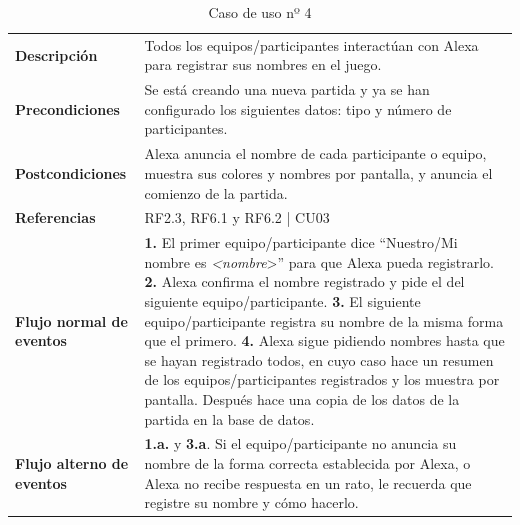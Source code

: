 \begin{table}[H]
	\centering
	\begin{tabular}{|p{3cm}|p{12cm}|}
		\hline
		\rowcolor{lightgray}
		\multicolumn{2}{|c|}{\textbf{CU04}: Registro de participantes} \\
		\hline
		\textbf{Descripción} & Todos los equipos/participantes interactúan con Alexa para registrar sus nombres en el juego. \vspace{0.2cm} \\
		\hline
		\textbf{Precondiciones} & Se está creando una nueva partida y ya se han configurado los siguientes datos: tipo y número de participantes. \vspace{0.2cm} \\
		\hline
		\textbf{Postcondiciones} & Alexa anuncia el nombre de cada participante o equipo, muestra sus colores y nombres por pantalla, y anuncia el comienzo de la partida. \vspace{0.2cm} \\
		\hline
		\textbf{Referencias} & RF2.3, RF6.1 y RF6.2  |  CU03 \vspace{0.2cm} \\
		\hline
		\textbf{Flujo normal de eventos} &
		\textbf{1.} El primer equipo/participante dice \enquote{Nuestro/Mi nombre es \textit{<nombre}>} para que Alexa pueda registrarlo. \newline
		\vspace{0.2cm}
		\textbf{2.} Alexa confirma el nombre registrado y pide el del siguiente equipo/participante. \newline
		\vspace{0.2cm}
		\textbf{3.} El siguiente equipo/participante registra su nombre de la misma forma que el primero. \newline
		\vspace{0.2cm} 
		\textbf{4.} Alexa sigue pidiendo nombres hasta que se hayan registrado todos, en cuyo caso hace un resumen de los equipos/participantes registrados y los muestra por pantalla. Después hace una copia de los datos de la partida en la base de datos.
		\vspace{0.2cm}\\
		\hline
		\textbf{Flujo alterno de eventos} &
		\textbf{1.a.} y \textbf{3.a}. Si el equipo/participante no anuncia su nombre de la forma correcta establecida por Alexa, o Alexa no recibe respuesta en un rato, le recuerda que registre su nombre y cómo hacerlo. \vspace{0.2cm} \\
		\hline
	\end{tabular}
	\caption{Caso de uso nº 4}
	\label{tab:CU04}
\end{table}

